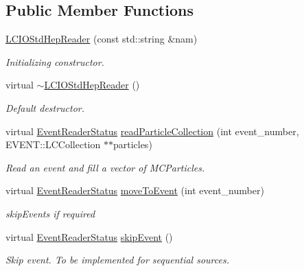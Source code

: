\subsection*{Public Member Functions}
\begin{DoxyCompactItemize}
\item 
\hyperlink{class_d_d4hep_1_1_simulation_1_1_l_c_i_o_std_hep_reader_ae877c907bf826120cc697aa80a39aba7}{LCIOStdHepReader} (const std::string \&nam)
\begin{DoxyCompactList}\small\item\em Initializing constructor. \item\end{DoxyCompactList}\item 
virtual \hyperlink{class_d_d4hep_1_1_simulation_1_1_l_c_i_o_std_hep_reader_a8435282d1017281ed60c84dee829859e}{$\sim$LCIOStdHepReader} ()
\begin{DoxyCompactList}\small\item\em Default destructor. \item\end{DoxyCompactList}\item 
virtual \hyperlink{class_d_d4hep_1_1_simulation_1_1_geant4_event_reader_ae4f4bc83ffcf5b0c1868ad78859851e7}{EventReaderStatus} \hyperlink{class_d_d4hep_1_1_simulation_1_1_l_c_i_o_std_hep_reader_ab358476ce7a1bab27504d2bfe4b8b630}{readParticleCollection} (int event\_\-number, EVENT::LCCollection $\ast$$\ast$particles)
\begin{DoxyCompactList}\small\item\em Read an event and fill a vector of MCParticles. \item\end{DoxyCompactList}\item 
virtual \hyperlink{class_d_d4hep_1_1_simulation_1_1_geant4_event_reader_ae4f4bc83ffcf5b0c1868ad78859851e7}{EventReaderStatus} \hyperlink{class_d_d4hep_1_1_simulation_1_1_l_c_i_o_std_hep_reader_a5f91d2bbdab11ee4554abf164acf1e1e}{moveToEvent} (int event\_\-number)
\begin{DoxyCompactList}\small\item\em skipEvents if required \item\end{DoxyCompactList}\item 
virtual \hyperlink{class_d_d4hep_1_1_simulation_1_1_geant4_event_reader_ae4f4bc83ffcf5b0c1868ad78859851e7}{EventReaderStatus} \hyperlink{class_d_d4hep_1_1_simulation_1_1_l_c_i_o_std_hep_reader_a54ae13b39268486b6edc4a7f9a11ada3}{skipEvent} ()
\begin{DoxyCompactList}\small\item\em Skip event. To be implemented for sequential sources. \item\end{DoxyCompactList}\end{DoxyCompactItemize}
